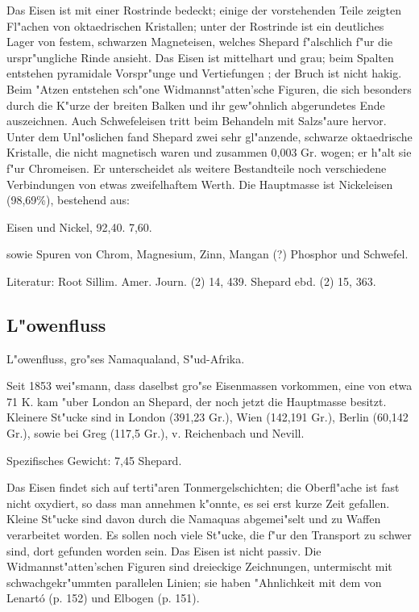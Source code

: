 \documentclass[a4paper, 11pt, oneside]{article}
\begin{document}
Das Eisen ist mit einer Rostrinde bedeckt; einige der vorstehenden Teile zeigten Fl"achen von oktaedrischen Kristallen; unter der Rostrinde ist ein deutliches Lager von festem, schwarzen Magneteisen, welches Shepard f"alschlich f"ur die urspr"ungliche Rinde ansieht. Das Eisen ist mittelhart und grau; beim Spalten entstehen pyramidale Vorspr"unge und Vertiefungen ; der Bruch ist nicht hakig. Beim "Atzen entstehen sch"one Widmannst"atten'sche Figuren, die sich besonders durch die K"urze der breiten Balken und ihr gew"ohnlich abgerundetes Ende auszeichnen. Auch Schwefeleisen tritt beim Behandeln mit Salzs"aure hervor. Unter dem Unl"oslichen fand Shepard zwei sehr gl"anzende, schwarze oktaedrische Kristalle, die nicht magnetisch waren und zusammen 0,003 Gr. wogen; er h"alt sie f"ur Chromeisen. Er unterscheidet als weitere Bestandteile noch verschiedene Verbindungen von etwas zweifelhaftem Werth. Die Hauptmasse ist Nickeleisen (98,69\%), bestehend aus:

Eisen und Nickel,  
92,40. 7,60.

sowie Spuren von Chrom, Magnesium, Zinn, Mangan (?) Phosphor und Schwefel.

Literatur: Root Sillim. Amer. Journ. (2) 14, 439. Shepard ebd. (2) 15, 363.

\subsection{L"owenfluss}

L"owenfluss, gro"ses Namaqualand, S"ud-Afrika.

Seit 1853 wei"smann, dass daselbst gro"se Eisenmassen vorkommen, eine von etwa 71 K. kam "uber London an Shepard, der noch jetzt die Hauptmasse besitzt. Kleinere St"ucke sind in London (391,23 Gr.), Wien (142,191 Gr.), Berlin (60,142 Gr.), sowie bei Greg (117,5 Gr.), v. Reichenbach und Nevill.

Spezifisches Gewicht: 7,45 Shepard.

Das Eisen findet sich auf terti"aren Tonmergelschichten; die Oberfl"ache ist fast nicht oxydiert, so dass man annehmen k"onnte, es sei erst kurze Zeit gefallen. Kleine St"ucke sind davon durch die Namaquas abgemei"selt und zu Waffen verarbeitet worden. Es sollen noch viele St"ucke, die f"ur den Transport zu schwer sind, dort gefunden worden sein. Das Eisen ist nicht passiv. Die Widmannst"atten'schen Figuren sind dreieckige Zeichnungen, untermischt mit schwachgekr"ummten parallelen Linien; sie haben "Ahnlichkeit mit dem von Lenartó (p. 152) und Elbogen (p. 151).
\end{document}
